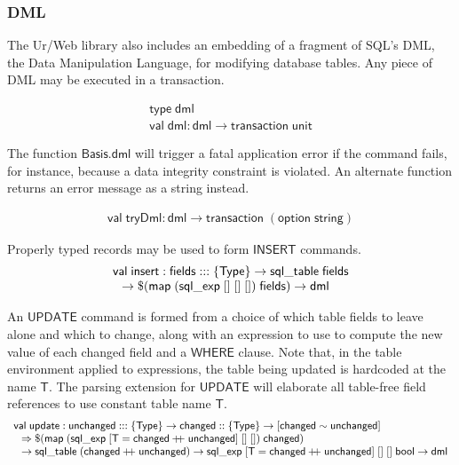 \documentclass{article}
\newcommand{\mt}[1]{\mathsf{#1}}
\newcommand{\rc}{+ \hspace{-.075in} + \;}
\begin{document}
\subsubsection{DML}

The Ur/Web library also includes an embedding of a fragment of SQL's DML, the Data Manipulation Language, for modifying database tables.  Any piece of DML may be executed in a transaction.

$$\begin{array}{l}
  \mt{type} \; \mt{dml} \\
  \mt{val} \; \mt{dml} : \mt{dml} \to \mt{transaction} \; \mt{unit}
\end{array}$$

The function $\mt{Basis.dml}$ will trigger a fatal application error if the command fails, for instance, because a data integrity constraint is violated.  An alternate function returns an error message as a string instead.

$$\begin{array}{l}
  \mt{val} \; \mt{tryDml} : \mt{dml} \to \mt{transaction} \; (\mt{option} \; \mt{string})
\end{array}$$

Properly typed records may be used to form $\mt{INSERT}$ commands.
$$\begin{array}{l}
  \mt{val} \; \mt{insert} : \mt{fields} ::: \{\mt{Type}\} \to \mt{sql\_table} \; \mt{fields} \\
  \hspace{.1in} \to \$(\mt{map} \; (\mt{sql\_exp} \; [] \; [] \; []) \; \mt{fields}) \to \mt{dml}
\end{array}$$

An $\mt{UPDATE}$ command is formed from a choice of which table fields to leave alone and which to change, along with an expression to use to compute the new value of each changed field and a $\mt{WHERE}$ clause.  Note that, in the table environment applied to expressions, the table being updated is hardcoded at the name $\mt{T}$.  The parsing extension for $\mt{UPDATE}$ will elaborate all table-free field references to use constant table name $\mt{T}$.
$$\begin{array}{l}
  \mt{val} \; \mt{update} : \mt{unchanged} ::: \{\mt{Type}\} \to \mt{changed} :: \{\mt{Type}\} \to [\mt{changed} \sim \mt{unchanged}] \\
  \hspace{.1in} \Rightarrow \$(\mt{map} \; (\mt{sql\_exp} \; [\mt{T} = \mt{changed} \rc \mt{unchanged}] \; [] \; []) \; \mt{changed}) \\
  \hspace{.1in} \to \mt{sql\_table} \; (\mt{changed} \rc \mt{unchanged}) \to \mt{sql\_exp} \; [\mt{T} = \mt{changed} \rc \mt{unchanged}] \; [] \; [] \; \mt{bool} \to \mt{dml}
\end{array}$$
\end{document}
